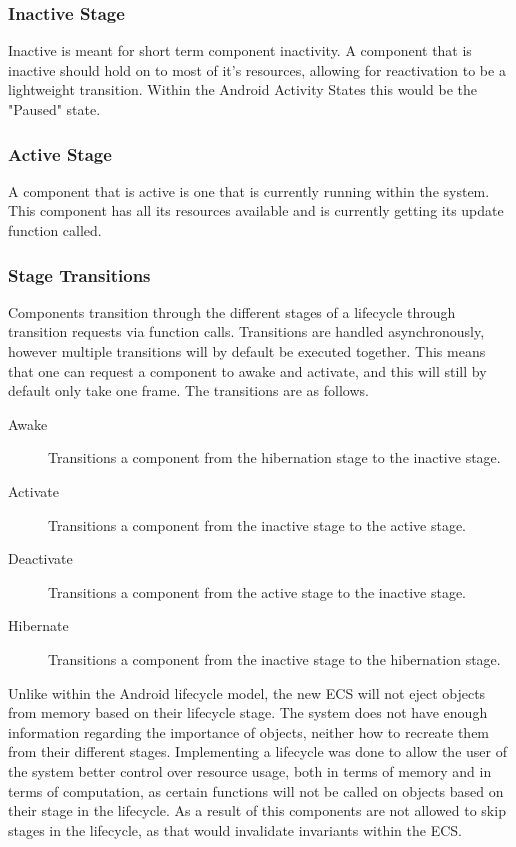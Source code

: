 \subsubsection{Inactive Stage}
Inactive is meant for short term component inactivity.
A component that is inactive should hold on to most of it's resources, allowing for reactivation to be a lightweight transition.
Within the Android Activity States this would be the "Paused" state\cite[Activity state and ejection from memory]{android_activity_lifecycle}.

\subsubsection{Active Stage}
A component that is active is one that is currently running within the system.
This component has all its resources available and is currently getting its update function called.

\subsubsection{Stage Transitions}
Components transition through the different stages of a lifecycle through transition requests via function calls.
Transitions are handled asynchronously, however multiple transitions will by default be executed together.
This means that one can request a component to awake and activate, and this will still by default only take one frame.
The transitions are as follows.
\begin{description}
    \item
    [Awake] Transitions a component from the hibernation stage to the inactive stage.

    \item
    [Activate] Transitions a component from the inactive stage to the active stage.

    \item
    [Deactivate] Transitions a component from the active stage to the inactive stage.

    \item
    [Hibernate] Transitions a component from the inactive stage to the hibernation stage.
\end{description}

Unlike within the Android lifecycle model, the new ECS will not eject objects from memory based on their lifecycle stage\cite[Activity state and ejection from memory]{android_activity_lifecycle}.
The system does not have enough information regarding the importance of objects, neither how to recreate them from their different stages.
Implementing a lifecycle was done to allow the user of the system better control over resource usage, both in terms of memory
and in terms of computation, as certain functions will not be called on objects based on their stage in the lifecycle.
As a result of this components are not allowed to skip stages in the lifecycle, as that would invalidate invariants within the ECS.

